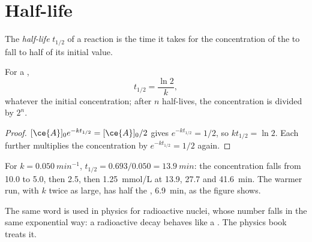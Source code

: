\section{Half-life}

\begin{definition}\label{def:g12:reaction-rates:half-life}
The \emph{half-life} $t_{1/2}$ of a reaction is the time
it takes for the concentration of the  to fall to half
of its initial value.
\end{definition}

\begin{proposition}\label{prop:g12:reaction-rates:half-life}
For a ,
\[
  t_{1/2} = \frac{\ln 2}{k},
\]
whatever the initial concentration; after $n$ half-lives, the
concentration is divided by $2^n$.
\end{proposition}

\begin{proof}
$[\ce{A}]_0 e^{-k t_{1/2}} = [\ce{A}]_0 / 2$ gives $e^{-k t_{1/2}} = 1/2$,
so $k t_{1/2} = \ln 2$. Each further  multiplies the
concentration by $e^{-k t_{1/2}} = 1/2$ again.
\end{proof}


\begin{example}\label{ex:g12:reaction-rates:half-lives}
For $k = \qty{0.050}{min^{-1}}$, $t_{1/2} = 0.693 / 0.050 =
\qty{13.9}{min}$: the concentration falls from 10.0 to 5.0, then 2.5,
then \qty{1.25}{mmol/L} at 13.9, 27.7 and \qty{41.6}{min}. The warmer run,
with $k$ twice as large, has half the , \qty{6.9}{min}, as the
figure shows.
\end{example}

\begin{remark}\label{rem:g12:reaction-rates:radioactive}
The same word is used in physics for radioactive nuclei, whose number
falls in the same exponential way: a radioactive decay behaves like a
. The physics book treats it.
\end{remark}

